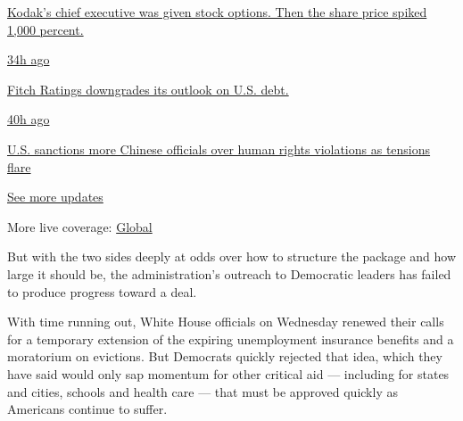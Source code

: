 \href{https://www.nytimes3xbfgragh.onion/live/2020/07/31/business/stock-market-today-coronavirus?action=click\&pgtype=Article\&state=default\&region=MAIN_CONTENT_1\&context=storylines_live_updates\#kodaks-chief-executive-was-given-stock-options-then-the-share-price-spiked-1000-percent}{Kodak's
chief executive was given stock options. Then the share price spiked
1,000 percent.}

\href{https://www.nytimes3xbfgragh.onion/live/2020/07/31/business/stock-market-today-coronavirus?action=click\&pgtype=Article\&state=default\&region=MAIN_CONTENT_1\&context=storylines_live_updates\#fitch-ratings-downgrades-its-outlook-on-us-debt}{34h
ago}

\href{https://www.nytimes3xbfgragh.onion/live/2020/07/31/business/stock-market-today-coronavirus?action=click\&pgtype=Article\&state=default\&region=MAIN_CONTENT_1\&context=storylines_live_updates\#fitch-ratings-downgrades-its-outlook-on-us-debt}{Fitch
Ratings downgrades its outlook on U.S. debt.}

\href{https://www.nytimes3xbfgragh.onion/live/2020/07/31/business/stock-market-today-coronavirus?action=click\&pgtype=Article\&state=default\&region=MAIN_CONTENT_1\&context=storylines_live_updates\#us-sanctions-more-chinese-officials-over-human-rights-violations-as-tensions-flare}{40h
ago}

\href{https://www.nytimes3xbfgragh.onion/live/2020/07/31/business/stock-market-today-coronavirus?action=click\&pgtype=Article\&state=default\&region=MAIN_CONTENT_1\&context=storylines_live_updates\#us-sanctions-more-chinese-officials-over-human-rights-violations-as-tensions-flare}{U.S.
sanctions more Chinese officials over human rights violations as
tensions flare}

\href{https://www.nytimes3xbfgragh.onion/live/2020/07/31/business/stock-market-today-coronavirus?action=click\&pgtype=Article\&state=default\&region=MAIN_CONTENT_1\&context=storylines_live_updates}{See
more updates}

More live coverage:
\href{https://www.nytimes3xbfgragh.onion/2020/08/01/world/coronavirus-covid-19.html?action=click\&pgtype=Article\&state=default\&region=MAIN_CONTENT_1\&context=storylines_live_updates}{Global}

But with the two sides deeply at odds over how to structure the package
and how large it should be, the administration's outreach to Democratic
leaders has failed to produce progress toward a deal.

With time running out, White House officials on Wednesday renewed their
calls for a temporary extension of the expiring unemployment insurance
benefits and a moratorium on evictions. But Democrats quickly rejected
that idea, which they have said would only sap momentum for other
critical aid --- including for states and cities, schools and health
care --- that must be approved quickly as Americans continue to suffer.

